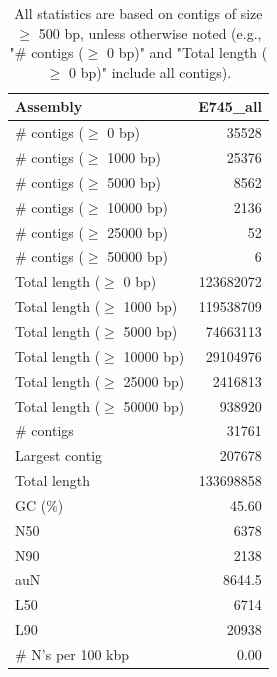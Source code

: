\documentclass[12pt,a4paper]{article}
\begin{document}
\begin{table}[ht]
\begin{center}
\caption{All statistics are based on contigs of size $\geq$ 500 bp, unless otherwise noted (e.g., "\# contigs ($\geq$ 0 bp)" and "Total length ($\geq$ 0 bp)" include all contigs).}
\begin{tabular}{|l*{1}{|r}|}
\hline
Assembly & E745\_all \\ \hline
\# contigs ($\geq$ 0 bp) & 35528 \\ \hline
\# contigs ($\geq$ 1000 bp) & 25376 \\ \hline
\# contigs ($\geq$ 5000 bp) & 8562 \\ \hline
\# contigs ($\geq$ 10000 bp) & 2136 \\ \hline
\# contigs ($\geq$ 25000 bp) & 52 \\ \hline
\# contigs ($\geq$ 50000 bp) & 6 \\ \hline
Total length ($\geq$ 0 bp) & 123682072 \\ \hline
Total length ($\geq$ 1000 bp) & 119538709 \\ \hline
Total length ($\geq$ 5000 bp) & 74663113 \\ \hline
Total length ($\geq$ 10000 bp) & 29104976 \\ \hline
Total length ($\geq$ 25000 bp) & 2416813 \\ \hline
Total length ($\geq$ 50000 bp) & 938920 \\ \hline
\# contigs & 31761 \\ \hline
Largest contig & 207678 \\ \hline
Total length & 133698858 \\ \hline
GC (\%) & 45.60 \\ \hline
N50 & 6378 \\ \hline
N90 & 2138 \\ \hline
auN & 8644.5 \\ \hline
L50 & 6714 \\ \hline
L90 & 20938 \\ \hline
\# N's per 100 kbp & 0.00 \\ \hline
\end{tabular}
\end{center}
\end{table}
\end{document}
